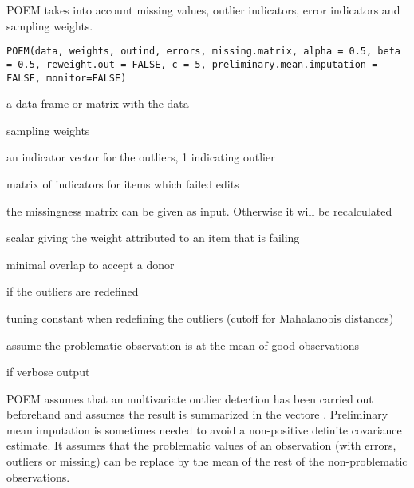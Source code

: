 %
\begin{Description}\relax
POEM takes into account missing values, outlier indicators, error indicators and sampling weights.
\end{Description}
%
\begin{Usage}
\begin{verbatim}
POEM(data, weights, outind, errors, missing.matrix, alpha = 0.5, beta = 0.5, reweight.out = FALSE, c = 5, preliminary.mean.imputation = FALSE, monitor=FALSE)
\end{verbatim}
\end{Usage}
%
\begin{Arguments}
\begin{ldescription}
\item[\code{data}] a data frame or matrix with the data
\item[\code{weights}] sampling weights 
\item[\code{outind}] an indicator vector for the outliers, 1 indicating outlier
\item[\code{errors}] matrix of indicators for items which failed edits
\item[\code{missing.matrix}]  the missingness matrix can be given as input. Otherwise it will be recalculated 
\item[\code{alpha}] scalar giving the weight attributed to an item that is failing 
\item[\code{beta}] minimal overlap to accept a donor
\item[\code{reweight.out}]  if  the outliers are redefined 
\item[\code{c}]  tuning constant when redefining the outliers (cutoff for Mahalanobis distances) 
\item[\code{preliminary.mean.imputation}] assume the problematic observation is at the mean of good observations 
\item[\code{monitor}]  if  verbose output 
\end{ldescription}
\end{Arguments}
%
\begin{Details}\relax
 POEM assumes that an multivariate outlier detection has been carried out beforehand and assumes the 
result is summarized in the vectore . 
Preliminary mean imputation is sometimes needed to avoid a non-positive definite covariance estimate. 
It assumes that the problematic values of an observation (with errors, outliers or missing) can be replace by 
the mean of the rest of the non-problematic observations. 
\end{Details}
